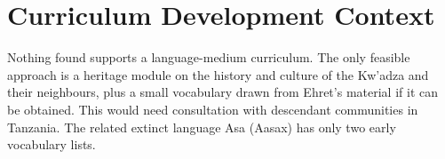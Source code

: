 \documentclass[12pt]{article}
\begin{document}
\section{Curriculum Development Context}
Nothing found supports a language-medium curriculum. The only feasible approach is a heritage module on the history and culture of the Kw'adza and their neighbours, plus a small vocabulary drawn from Ehret's material if it can be obtained. This would need consultation with descendant communities in Tanzania. The related extinct language Asa (Aasax) has only two early vocabulary lists.
\end{document}

